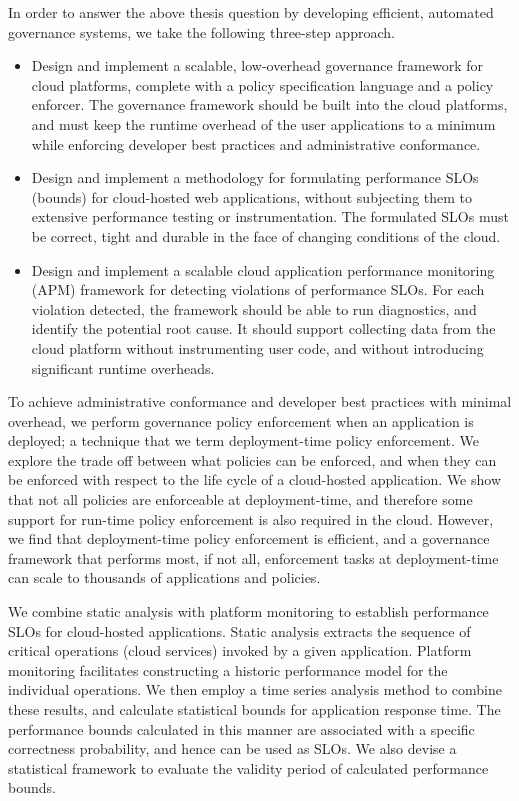 In order to answer the above thesis question by developing efficient, automated governance systems,
we take the following three-step approach.
\begin{itemize}
\item Design and implement a scalable, low-overhead governance framework for cloud platforms,
complete with a policy specification language and a policy enforcer. The governance framework should be
built into the cloud platforms, and must
keep the runtime overhead of the user applications to a minimum while enforcing
developer best practices and administrative conformance.
\item Design and implement a methodology for formulating performance SLOs (bounds)
for cloud-hosted web applications, without
 subjecting them to extensive performance testing or instrumentation. The formulated
SLOs must be correct, tight and durable in the face of changing conditions of the cloud.
 \item Design and implement a scalable cloud application performance monitoring (APM) framework for detecting
violations of performance SLOs. For each
violation detected, the framework should be able to run diagnostics, and identify the potential
root cause. It should support collecting data from the cloud platform
 without instrumenting user code, and without introducing significant runtime overheads.
\end{itemize}

To achieve administrative conformance and developer best practices with minimal overhead,
we perform governance policy enforcement when an application is deployed; a technique that we
term deployment-time policy enforcement.
We explore the
trade off between what policies can be enforced, and when they can be enforced with respect
to the life cycle of a cloud-hosted application. We show that not all policies
are enforceable at deployment-time, and therefore some support for run-time policy enforcement
is also required in the cloud. However, we find that
deployment-time policy enforcement is efficient, and a governance framework that
performs most, if not all, enforcement tasks at deployment-time can scale
to thousands of applications and policies.

We combine static analysis with platform monitoring to establish performance SLOs for
cloud-hosted applications. Static analysis
extracts the sequence of critical operations (cloud services) invoked by a given application.
Platform monitoring facilitates constructing a historic performance model for the individual operations.
We then employ a time series analysis method to combine these results, and calculate statistical bounds 
for application response time. The performance bounds calculated in this manner
are associated with a specific correctness probability, and hence can be used
as SLOs. We also devise a statistical framework to evaluate the validity period of 
calculated performance bounds.


